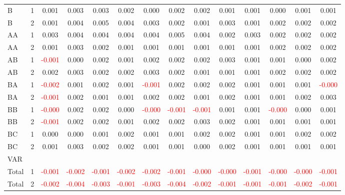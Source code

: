 \begin{table}[!htb]
{\begin{tabular}{llcccccccccccc}
B & 1 & 0.001 & 0.003 & 0.003 & 0.002 & 0.000 & 0.002 & 0.002 & 0.001 & 0.001 & 0.000 & 0.001 & 0.001\\
B & 2 & 0.001 & 0.004 & 0.005 & 0.004 & 0.003 & 0.002 & 0.001 & 0.003 & 0.001 & 0.002 & 0.002 & 0.002\\
AA & 1 & 0.003 & 0.004 & 0.004 & 0.004 & 0.004 & 0.005 & 0.004 & 0.002 & 0.003 & 0.002 & 0.002 & 0.002\\
AA & 2 & 0.001 & 0.003 & 0.002 & 0.001 & 0.001 & 0.001 & 0.001 & 0.001 & 0.001 & 0.002 & 0.002 & 0.002\\
AB & 1 & \textcolor{red}{-0.001} & 0.000 & 0.002 & 0.001 & 0.002 & 0.002 & 0.002 & 0.003 & 0.001 & 0.001 & 0.000 & 0.002\\
AB & 2 & 0.002 & 0.003 & 0.002 & 0.002 & 0.003 & 0.002 & 0.001 & 0.001 & 0.001 & 0.002 & 0.002 & 0.002\\
BA & 1 & \textcolor{red}{-0.002} & 0.001 & 0.002 & 0.001 & \textcolor{red}{-0.001} & 0.002 & 0.002 & 0.002 & 0.001 & 0.001 & 0.001 & \textcolor{red}{-0.000}\\
BA & 2 & \textcolor{red}{-0.001} & 0.002 & 0.001 & 0.001 & 0.002 & 0.002 & 0.001 & 0.002 & 0.001 & 0.001 & 0.002 & 0.003\\
BB & 1 & \textcolor{red}{-0.000} & 0.002 & 0.002 & 0.000 & \textcolor{red}{-0.000} & \textcolor{red}{-0.001} & \textcolor{red}{-0.001} & 0.001 & 0.001 & \textcolor{red}{-0.000} & 0.000 & 0.001\\
BB & 2 & \textcolor{red}{-0.001} & 0.002 & 0.002 & 0.001 & 0.002 & 0.002 & 0.003 & 0.002 & 0.001 & 0.001 & 0.001 & 0.001\\
BC & 1 & 0.000 & 0.000 & 0.001 & 0.002 & 0.001 & 0.001 & 0.002 & 0.002 & 0.001 & 0.001 & 0.002 & 0.002\\
BC & 2 & 0.001 & 0.003 & 0.002 & 0.002 & 0.001 & 0.001 & 0.000 & 0.002 & 0.001 & 0.001 & 0.001 & 0.001\\
\hline
VAR &  &  &  &  &  &  &  &  &  &  &  &  & \\
\hline
Total & 1 & \textcolor{red}{-0.001} & \textcolor{red}{-0.002} & \textcolor{red}{-0.001} & \textcolor{red}{-0.002} & \textcolor{red}{-0.002} & \textcolor{red}{-0.001} & \textcolor{red}{-0.000} & \textcolor{red}{-0.000} & \textcolor{red}{-0.001} & \textcolor{red}{-0.000} & \textcolor{red}{-0.000} & \textcolor{red}{-0.001}\\
Total & 2 & \textcolor{red}{-0.002} & \textcolor{red}{-0.004} & \textcolor{red}{-0.003} & \textcolor{red}{-0.001} & \textcolor{red}{-0.003} & \textcolor{red}{-0.004} & \textcolor{red}{-0.002} & \textcolor{red}{-0.001} & \textcolor{red}{-0.001} & \textcolor{red}{-0.001} & \textcolor{red}{-0.002} & \textcolor{red}{-0.001}\\

\end{tabular}}
\end{table}
